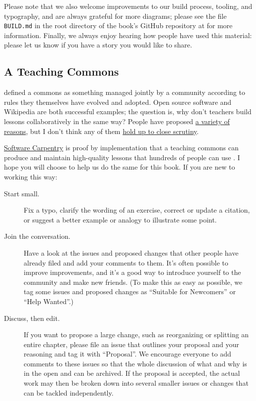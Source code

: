 Please note that we also welcome improvements to our build process,
tooling, and typography, and are always grateful for more diagrams;
please see the file \texttt{BUILD.md} in the root directory of the
book's GitHub repository at {\repository} for more information.
Finally, we always enjoy hearing how people have used this material:
please let us know if you have a story you would like to share.

\subsection*{A Teaching Commons}

 defined a commons as something managed
jointly by a community according to rules they themselves have evolved
and adopted.  Open source software and Wikipedia are both successful
examples; the question is, why don't teachers build lessons
collaboratively in the same way?  People have proposed
\href{http://blog.mrmeyer.com/2016/why-secondary-teachers-dont-want-a-github-for-lesson-plans/}{a
  variety of reasons}, but I don't think any of them
\href{http://third-bit.com/2016/04/29/why-teachers-dont-collaborate.html}{hold
  up to close scrutiny}.

\href{http://software-carpentry.org}{Software Carpentry} is proof by
implementation that a teaching commons can produce and maintain
high-quality lessons that hundreds of people can use \cite{Wils2016}.
I hope you will choose to help us do the same for this book.  If you
are new to working this way:

\begin{description}

\item[Start small.] Fix a typo, clarify the wording of an exercise,
  correct or update a citation, or suggest a better example or
  analogy to illustrate some point.

\item[Join the conversation.] Have a look at the issues and proposed
  changes that other people have already filed and add your comments
  to them.  It's often possible to improve improvements, and it's a
  good way to introduce yourself to the community and make new
  friends.  (To make this as easy as possible, we tag some issues and
  proposed changes as ``Suitable for Newcomers'' or ``Help Wanted''.)

\item[Discuss, then edit.] If you want to propose a large change, such
  as reorganizing or splitting an entire chapter, please file an issue
  that outlines your proposal and your reasoning and tag it with
  ``Proposal''.  We encourage everyone to add comments to these issues
  so that the whole discussion of what and why is in the open and can
  be archived.  If the proposal is accepted, the actual work may then
  be broken down into several smaller issues or changes that can be
  tackled independently.

\end{description}
